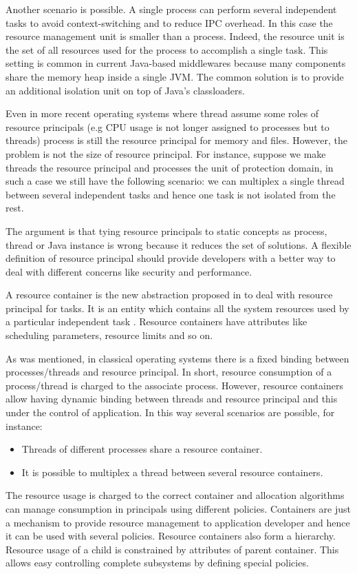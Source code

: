 Another scenario is possible.
A single process can perform several independent tasks to avoid context-switching and to reduce IPC overhead.
In this case the resource management unit is smaller than a process.
Indeed, the resource unit is the set of all resources used for the process to accomplish a single task.
This setting is common in current Java-based middlewares because many components share the memory heap inside a single JVM.
The common solution is to provide an additional isolation unit on top of Java's classloaders.

Even in more recent operating systems where thread assume some roles of resource principals (e.g CPU usage is not longer assigned to processes but to threads) process is still the resource principal for memory and files.
However, the problem is not the size of resource principal.
For instance, suppose we make threads the resource principal and processes the unit of protection domain, in such a case we still have the following scenario: we can multiplex a single thread between several independent tasks and hence one task is not isolated from the rest.

The argument is that tying resource principals to static concepts as process, thread or Java instance is wrong because it reduces the set of solutions.
A flexible definition of resource principal should provide developers with a better way to deal with different concerns like security and performance.

A resource container is the new abstraction proposed in \cite{Banga:1999:RCN:296806.296810} to deal with resource principal for tasks. It is an entity which contains all the system resources used by a particular independent task \cite{Banga:1999:RCN:296806.296810}. Resource containers have attributes like scheduling parameters, resource limits and so on.

As was mentioned, in classical operating systems there is a fixed binding between processes/threads and resource principal.
In short, resource consumption of a process/thread is charged to the associate process.
However, resource containers allow having dynamic binding between threads and resource principal and this under the control of application.
In this way several scenarios are possible, for instance:
\begin{itemize}
\item Threads of different processes share a resource container.
\item It is possible to multiplex a thread between several resource containers.
\end{itemize}
The resource usage is charged to the correct container and allocation algorithms can manage consumption in principals using different policies.
Containers are just a mechanism to provide resource management to application developer and hence it can be used with several policies.
Resource containers also form a hierarchy.
Resource usage of a child is constrained by attributes of parent container.
This allows easy controlling complete subsystems by defining special policies.

